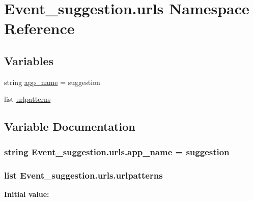 \hypertarget{namespaceEvent__suggestion_1_1urls}{}\section{Event\+\_\+suggestion.\+urls Namespace Reference}
\label{namespaceEvent__suggestion_1_1urls}
\subsection*{Variables}
\begin{DoxyCompactItemize}
\item 
string \hyperlink{namespaceEvent__suggestion_1_1urls_aa5846276b89a39e47cf547d8604cfb45}{app\+\_\+name} = \textquotesingle{}suggestion\textquotesingle{}
\item 
list \hyperlink{namespaceEvent__suggestion_1_1urls_aac955dc0d20f13d2f1ec6533b8afee66}{urlpatterns}
\end{DoxyCompactItemize}


\subsection{Variable Documentation}
\subsubsection[{\texorpdfstring{app\+\_\+name}{app_name}}]{\setlength{\rightskip}{0pt plus 5cm}string Event\+\_\+suggestion.\+urls.\+app\+\_\+name = \textquotesingle{}suggestion\textquotesingle{}}\hypertarget{namespaceEvent__suggestion_1_1urls_aa5846276b89a39e47cf547d8604cfb45}{}\label{namespaceEvent__suggestion_1_1urls_aa5846276b89a39e47cf547d8604cfb45}
\subsubsection[{\texorpdfstring{urlpatterns}{urlpatterns}}]{\setlength{\rightskip}{0pt plus 5cm}list Event\+\_\+suggestion.\+urls.\+urlpatterns}\hypertarget{namespaceEvent__suggestion_1_1urls_aac955dc0d20f13d2f1ec6533b8afee66}{}\label{namespaceEvent__suggestion_1_1urls_aac955dc0d20f13d2f1ec6533b8afee66}
{\bfseries Initial value\+:}
